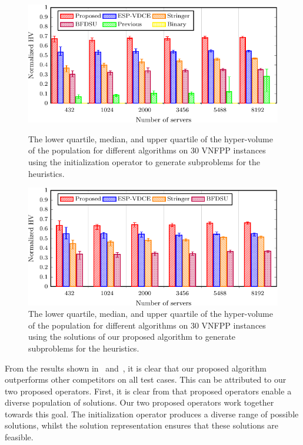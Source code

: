 \begin{figure}
    \centering
    \hfill
    \begin{minipage}[t]{.48\textwidth}
        \centering
        \includegraphics[width=\columnwidth]{graphs/comparison/comparison-crop}
        \caption{The lower quartile, median, and upper quartile of the hyper-volume of the population for different algorithms on 30 VNFPP instances using the initialization operator to generate subproblems for the heuristics.}
        \label{fig:alg_comparison}
    \end{minipage}\hfill
    \begin{minipage}[t]{.48\textwidth}
        \centering
        \includegraphics[width=\columnwidth]{graphs/comparison/alg_fixed-crop}
        \caption{The lower quartile, median, and upper quartile of the hyper-volume of the population for different algorithms on 30 VNFPP instances using the solutions of our proposed algorithm to generate subproblems for the heuristics.}
        \label{fig:alg_fixed}
    \end{minipage}
    \hfill
\end{figure}

From the results shown in~ and~, it is clear that our proposed algorithm outperforms other competitors on all test cases. This can be attributed to our two proposed operators. First, it is clear from  that proposed operators enable a diverse population of solutions. Our two proposed operators work together towards this goal. The initialization operator produces a diverse range of possible solutions, whilst the solution representation ensures that these solutions are feasible.

